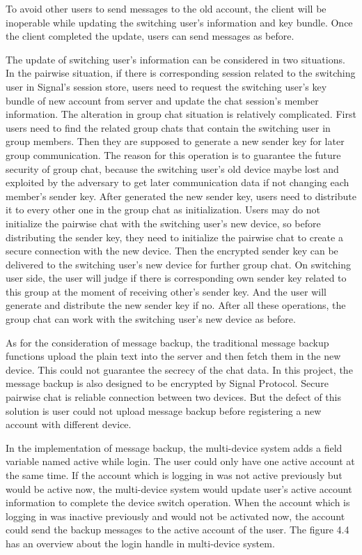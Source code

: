 \begin{enumerate}[label=(\roman*)]
To avoid other users to send messages to the old account, the client will be inoperable while updating the switching user's information and key bundle. Once the client completed the update, users can send messages as before.

The update of switching user's information can be considered in two situations. In the pairwise situation, if there is corresponding session related to the switching user in Signal's session store, users need to request the switching user's key bundle of new account from server and update the chat session's member information. The alteration in group chat situation is relatively complicated. First users need to find the related group chats that contain the switching user in group members. Then they are supposed to generate a new sender key for later group communication. The reason for this operation is to guarantee the future security of group chat, because the switching user's old device maybe lost and exploited by the adversary to get later communication data if not changing each member's sender key. After generated the new sender key, users need to distribute it to every other one in the group chat as initialization. Users may do not initialize the pairwise chat with the switching user's new device, so before distributing the sender key, they need to initialize the pairwise chat to create a secure connection with the new device. Then the encrypted sender key can be delivered to the switching user's new device for further group chat. On switching user side, the user will judge if there is corresponding own sender key related to this group at the moment of receiving other's sender key. And the user will generate and distribute the new sender key if no. After all these operations, the group chat can work with the switching user's new device as before.

As for the consideration of message backup, the traditional message backup functions upload the plain text into the server and then fetch them in the new device. This could not guarantee the secrecy of the chat data. In this project, the message backup is also designed to be encrypted by Signal Protocol. Secure pairwise chat is reliable connection between two devices. But the defect of this solution is user could not upload message backup before registering a new account with different device.

In the implementation of message backup, the multi-device system adds a field variable named active while login. The user could only have one active account at the same time. If the account which is logging in was not active previously but would be active now, the multi-device system would update user's active account information to complete the device switch operation. When the account which is logging in was inactive previously and would not be activated now, the account could send the backup messages to the active account of the user. The figure 4.4 has an overview about the login handle in multi-device system.


\end{enumerate}
